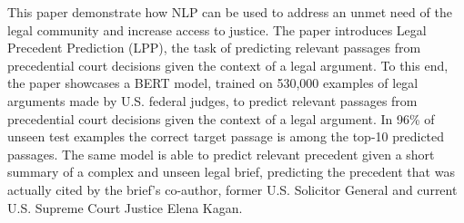 This paper demonstrate how NLP can be used to address an unmet need of the legal community and increase access to justice. The paper introduces Legal Precedent Prediction (LPP), the task of predicting relevant passages from precedential court decisions given the context of a legal argument. To this end, the paper showcases a BERT model, trained on 530,000 examples of legal arguments made by U.S. federal judges, to predict relevant passages from precedential court decisions given the context of a legal argument. In 96\% of unseen test examples the correct target passage is among the top-10 predicted passages. The same model is able to predict relevant precedent given a short summary of a complex and unseen legal brief, predicting the precedent that was actually cited by the brief's co-author, former U.S. Solicitor General and current U.S. Supreme Court Justice Elena Kagan.
